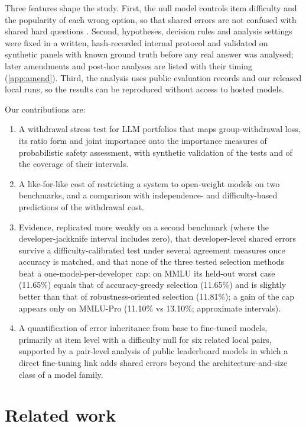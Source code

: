 \documentclass[preprint,12pt,authoryear]{elsarticle}
\begin{document}
Three features shape the study. First, the null model controls item difficulty and the popularity of each wrong option, so that shared errors are not confused with shared hard questions \citep{eckhardt1985}. Second, hypotheses, decision rules and analysis settings were fixed in a written, hash-recorded internal protocol and validated on synthetic panels with known ground truth before any real answer was analysed; later amendments and post-hoc analyses are listed with their timing (\ref{app:amend}). Third, the analysis uses public evaluation records and our released local runs, so the results can be reproduced without access to hosted models.

Our contributions are:
\begin{enumerate}
\item A withdrawal stress test for LLM portfolios that maps group-withdrawal loss, its ratio form and joint importance onto the importance measures of probabilistic safety assessment, with synthetic validation of the tests and of the coverage of their intervals.
\item A like-for-like cost of restricting a system to open-weight models on two benchmarks, and a comparison with independence- and difficulty-based predictions of the withdrawal cost.
\item Evidence, replicated more weakly on a second benchmark (where the developer-jackknife interval includes zero), that developer-level shared errors survive a difficulty-calibrated test under several agreement measures once accuracy is matched, and that none of the three tested selection methods beat a one-model-per-developer cap: on MMLU its held-out worst case (11.65\%) equals that of accuracy-greedy selection (11.65\%) and is slightly better than that of robustness-oriented selection (11.81\%); a gain of the cap appears only on MMLU-Pro (11.10\% vs 13.10\%; approximate intervals).
\item A quantification of error inheritance from base to fine-tuned models, primarily at item level with a difficulty null for six related local pairs, supported by a pair-level analysis of public leaderboard models in which a direct fine-tuning link adds shared errors beyond the architecture-and-size class of a model family.
\end{enumerate}

\section{Related work}
\end{document}
